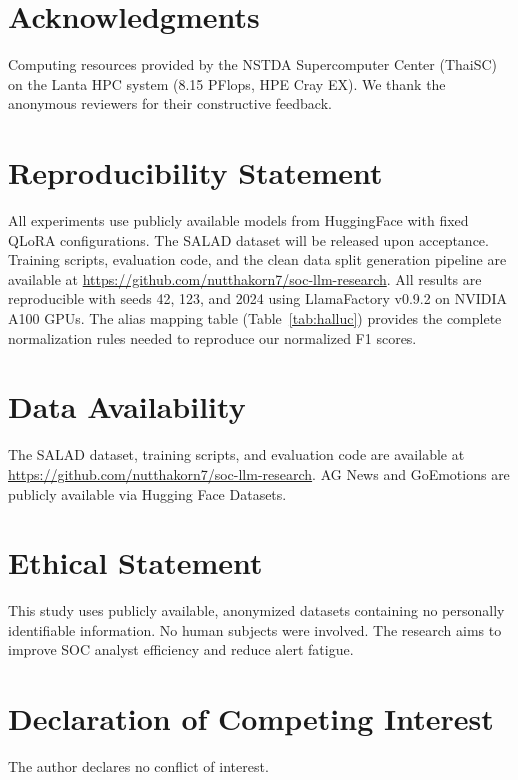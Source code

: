 \documentclass[journal]{IEEEtran}
\begin{document}
\section*{Acknowledgments}
Computing resources provided by the NSTDA Supercomputer Center (ThaiSC) on the Lanta HPC system (8.15 PFlops, HPE Cray EX). We thank the anonymous reviewers for their constructive feedback.

\section*{Reproducibility Statement}
All experiments use publicly available models from HuggingFace with fixed QLoRA configurations. The SALAD dataset will be released upon acceptance. Training scripts, evaluation code, and the clean data split generation pipeline are available at \url{https://github.com/nutthakorn7/soc-llm-research}. All results are reproducible with seeds 42, 123, and 2024 using LlamaFactory v0.9.2 on NVIDIA A100 GPUs. The alias mapping table (Table~\ref{tab:halluc}) provides the complete normalization rules needed to reproduce our normalized F1 scores.


\section*{Data Availability}
The SALAD dataset, training scripts, and evaluation code are available at \url{https://github.com/nutthakorn7/soc-llm-research}. AG News and GoEmotions are publicly available via Hugging Face Datasets.

\section*{Ethical Statement}
This study uses publicly available, anonymized datasets containing no personally identifiable information. No human subjects were involved. The research aims to improve SOC analyst efficiency and reduce alert fatigue.

\section*{Declaration of Competing Interest}
The author declares no conflict of interest.
\end{document}
